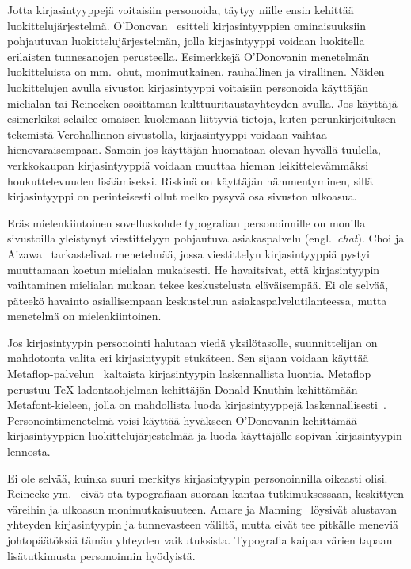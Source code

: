 \documentclass[finnish, 12pt, a4paper, elec, utf8, a-1b]{aaltothesis}
\begin{document}
Jotta kirjasintyyppejä voitaisiin personoida, täytyy niille ensin kehittää
luokittelujärjestelmä. O'Donovan~\cite{odonovan_2015} esitteli kirjasintyyppien
ominaisuuksiin pohjautuvan luokittelujärjestelmän, jolla kirjasintyyppi voidaan
luokitella erilaisten tunnesanojen perusteella. Esimerkkejä O'Donovanin
menetelmän luokitteluista on mm.~ohut, monimutkainen, rauhallinen ja virallinen.
Näiden luokittelujen avulla sivuston kirjasintyyppi voitaisiin personoida
käyttäjän mielialan tai Reinecken osoittaman kulttuuritaustayhteyden avulla. Jos
käyttäjä esimerkiksi selailee omaisen kuolemaan liittyviä tietoja, kuten
perunkirjoituksen tekemistä Verohallinnon sivustolla, kirjasintyyppi voidaan
vaihtaa hienovaraisempaan. Samoin jos käyttäjän huomataan olevan hyvällä
tuulella, verkkokaupan kirjasintyyppiä voidaan muuttaa hieman leikittelevämmäksi
houkuttelevuuden lisäämiseksi. Riskinä on käyttäjän hämmentyminen, sillä
kirjasintyyppi on perinteisesti ollut melko pysyvä osa sivuston ulkoasua.

Eräs mielenkiintoinen sovelluskohde typografian personoinnille on monilla
sivustoilla yleistynyt viestittelyyn pohjautuva asiakaspalvelu
(engl.~\textit{chat}). Choi ja Aizawa~\cite{choi_aizawa_2018} tarkastelivat
menetelmää, jossa viestittelyn kirjasintyyppiä pystyi muuttamaan koetun
mielialan mukaisesti. He havaitsivat, että kirjasintyypin vaihtaminen mielialan
mukaan tekee keskustelusta eläväisempää. Ei ole selvää, päteekö havainto
asiallisempaan keskusteluun asiakaspalvelutilanteessa, mutta menetelmä on
mielenkiintoinen.

Jos kirjasintyypin personointi halutaan viedä yksilötasolle, suunnittelijan on
mahdotonta valita eri kirjasintyypit etukäteen. Sen sijaan voidaan käyttää
Metaflop-palvelun~\cite{metaflop-website} kaltaista kirjasintyypin
laskennallista luontia. Metaflop perustuu TeX-ladontaohjelman kehittäjän Donald
Knuthin kehittämään Metafont-kieleen, jolla on mahdollista luoda
kirjasintyyppejä laskennallisesti~\cite{knuth_1986}. Personointimenetelmä voisi
käyttää hyväkseen O'Donovanin kehittämää kirjasintyyppien luokittelujärjestelmää
ja luoda käyttäjälle sopivan kirjasintyypin lennosta.

Ei ole selvää, kuinka suuri merkitys kirjasintyypin personoinnilla oikeasti
olisi. Reinecke ym.~\cite{10.1145/2556288.2557052} eivät ota typografiaan
suoraan kantaa tutkimuksessaan, keskittyen väreihin ja ulkoasun
monimutkaisuuteen. Amare ja Manning~\cite{10.1109/IPCC.2012.6408605} löysivät
alustavan yhteyden kirjasintyypin ja tunnevasteen väliltä, mutta eivät tee
pitkälle meneviä johtopäätöksiä tämän yhteyden vaikutuksista. Typografia kaipaa
värien tapaan lisätutkimusta personoinnin hyödyistä.
\end{document}
